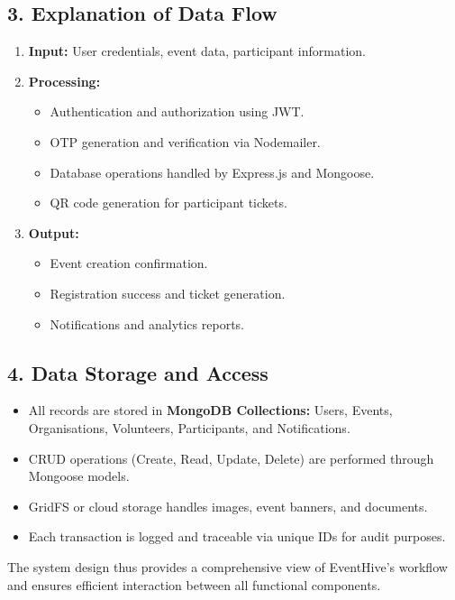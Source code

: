 \documentclass[12pt,a4paper]{report}
\begin{document}
\subsection*{3. Explanation of Data Flow}

\begin{enumerate}
    \item \textbf{Input:} User credentials, event data, participant information.
    \item \textbf{Processing:} 
        \begin{itemize}
            \item Authentication and authorization using JWT.
            \item OTP generation and verification via Nodemailer.
            \item Database operations handled by Express.js and Mongoose.
            \item QR code generation for participant tickets.
        \end{itemize}
    \item \textbf{Output:} 
        \begin{itemize}
            \item Event creation confirmation.
            \item Registration success and ticket generation.
            \item Notifications and analytics reports.
        \end{itemize}
\end{enumerate}

\subsection*{4. Data Storage and Access}

\begin{itemize}
    \item All records are stored in \textbf{MongoDB Collections:} Users, Events, Organisations, Volunteers, Participants, and Notifications.
    \item CRUD operations (Create, Read, Update, Delete) are performed through Mongoose models.
    \item GridFS or cloud storage handles images, event banners, and documents.
    \item Each transaction is logged and traceable via unique IDs for audit purposes.
\end{itemize}

\noindent
The system design thus provides a comprehensive view of EventHive’s workflow and ensures efficient interaction between all functional components.
\end{document}
